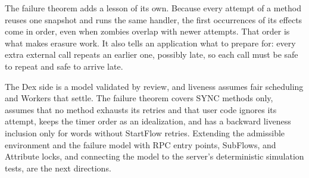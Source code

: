 The failure theorem adds a lesson of its own. Because every attempt of a
method reuses one snapshot and runs the same handler, the first
occurrences of its effects come in order, even when zombies overlap with
newer attempts. That order is what makes erasure work. It also tells an application what to prepare for: every extra
external call repeats an earlier one, possibly late, so each call must be
safe to repeat and safe to arrive late.

The Dex side is a model validated by review, and liveness assumes fair scheduling and Workers that settle. The
failure theorem covers SYNC methods only, assumes that no method exhausts
its retries and that user code ignores its attempt, keeps the timer order
as an idealization, and has a backward liveness inclusion only for words
without StartFlow retries. Extending the admissible environment and the
failure model with RPC entry points, SubFlows, and Attribute locks, and
connecting the model to the server's deterministic simulation tests, are
the next directions.
